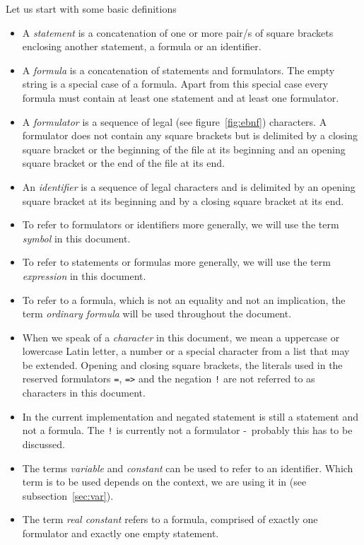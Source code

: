 \documentclass[british]{article}
\newcommand\prv{bc}
\newcommand\m[1]{\texttt{#1}}
\begin{document}
Let us start with some basic definitions
\begin{itemize}
	\item
		A \emph{statement} is a concatenation of one or more pair/s of square
		brackets enclosing another statement, a formula or an identifier.
	\item
		A \emph{formula} is a concatenation of statements and formulators.
		The empty string is a special case of a formula. Apart from this special
		case every formula must contain at least one statement and at least
		one formulator.
	\item
		A \emph{formulator }is a sequence of legal (see figure~\ref{fig:ebnf})
		characters. A formulator does not contain any square brackets but
		is delimited by a closing square bracket or the beginning of the file
		at its beginning and an opening square bracket or the end of the file
		at its end.
	\item An \emph{identifier} is a sequence of legal characters and is
		delimited by an opening square bracket at its beginning and by a closing
		square bracket at its end.
	\item
		To refer to formulators or identifiers more generally, we will use
		the term \emph{symbol }in this document.
	\item
		To refer to statements or formulas more generally, we will use the
		term \emph{expression }in this document.
	\item
		To refer to a formula, which is not an equality and not an implication,
		the term \emph{ordinary formula} will be used throughout the document.
	\item
		When we speak of a \emph{character} in this document, we mean a
		uppercase or lowercase Latin letter, a number or a special character
		from a list that may be extended. Opening and closing square brackets,
		the literals used in the reserved formulators \m{=}, \m{=>} and the
		negation \m{!} are not referred to as characters in this document.
	\item
		In the current implementation and negated statement is still a statement
		and not a formula. The \m{!} is currently not a formulator -\ probably
		this has to be discussed.
	\item
		The terms \emph{variable} and \emph{constant} can be used to refer
		to an identifier. Which term is to be used depends on the context,
		we are using it in (see subsection~\ref{sec:var}).
	\item
		The term \emph{real constant} refers to a formula, comprised of exactly
		one formulator and exactly one empty statement.
\end{itemize}
\end{document}
